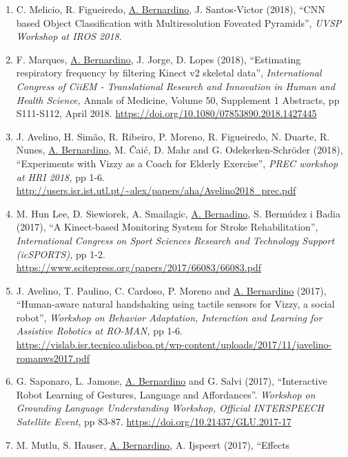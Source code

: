 \documentclass[
]{article}
\begin{document}
\begin{enumerate}
  R. Zenha, P. Vicente, L. Jamone and \ul{A. Bernardino} (2018), ``Robot
  body model self calibration through contact events'', \emph{Bodis
  Workshop at IROS 2018,} 4 pages.
  \url{https://webarchiv.typo3.tum.de/EI/ps/fileadmin/w00bcw/www/selfception/files/bodis2018/zenha_bodis-iros18ws_FINAL.pdf}~
\item
  C. Melicio, R. Figueiredo, \ul{A. Bernardino}, J. Santos-Victor
  (2018), ``CNN based Object Classification with Multiresolution
  Foveated Pyramids'', \emph{UVSP Workshop at IROS 2018}.
\item
  F. Marques, \ul{A. Bernardino}, J. Jorge, D. Lopes (2018),
  ``Estimating respiratory frequency by filtering Kinect v2 skeletal
  data'', \emph{International Congress of CiiEM - Translational Research
  and Innovation in Human and Health Science,} Annals of Medicine,
  Volume 50, Supplement 1 Abstracts, pp S111-S112, April 2018.
  \url{https://doi.org/10.1080/07853890.2018.1427445}~
\item
  J. Avelino, H. Simão, R. Ribeiro, P. Moreno, R. Figueiredo, N. Duarte,
  R. Nunes, \ul{A. Bernardino}, M. Čaić, D. Mahr and G.
  Odekerken-Schröder (2018), ``Experiments with Vizzy as a Coach for
  Elderly Exercise'', \emph{PREC workshop at HRI 2018,} pp 1-6.
  \url{http://users.isr.ist.utl.pt/~alex/papers/aha/Avelino2018_prec.pdf}
\item
  M. Hun Lee, D. Siewiorek, A. Smailagic, \ul{A. Bernadino}, S. Bermúdez
  i Badia (2017), ``A Kinect-based Monitoring System for Stroke
  Rehabilitation'', \emph{International Congress on Sport Sciences
  Research and Technology Support (icSPORTS),} pp 1-2.
  \url{https://www.scitepress.org/papers/2017/66083/66083.pdf}~
\item
  J. Avelino, T. Paulino, C. Cardoso, P. Moreno and \ul{A. Bernardino}
  (2017), ``Human-aware natural handshaking using tactile sensors for
  Vizzy, a social robot'', \emph{Workshop on Behavior Adaptation,
  Interaction and Learning for Assistive Robotics at RO-MAN,} pp 1-6.
  \url{https://vislab.isr.tecnico.ulisboa.pt/wp-content/uploads/2017/11/javelino-romanws2017.pdf}~
\item
  G. Saponaro, L. Jamone, \ul{A. Bernardino} and G. Salvi (2017),
  ``Interactive Robot Learning of Gestures, Language and Affordances''.
  \emph{Workshop on Grounding Language Understanding Workshop, Official
  INTERSPEECH Satellite Event}, pp 83-87.
  \url{https://doi.org/10.21437/GLU.2017-17}~
\item
  M. Mutlu, S. Hauser, \ul{A. Bernardino}, A. Ijspeert (2017), ``Effects

\end{enumerate}
\end{document}
